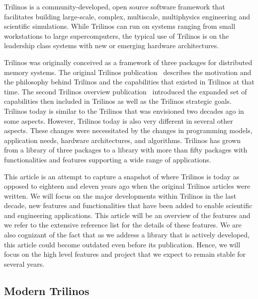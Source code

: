 


Trilinos is a community-developed, open source software framework that facilitates building large-scale, complex, multiscale, multiphysics engineering and scientific simulations. While Trilinos can run on systems ranging from small workstations to large supercomputers, the typical use of Trilinos is on the leadership class systems with new or emerging hardware architectures.

Trilinos was originally conceived as a framework of three packages for distributed memory systems. The original Trilinos publication~\cite{Heroux2005a} describes the motivation and the philosophy behind Trilinos and the capabilities that existed in Trilinos at that time. The second Trilinos overview publication~\cite{Heroux2012} introduced the expanded set of capabilities then included in Trilinos as well as the Trilinos strategic goals. Trilinos today is similar to the Trilinos that was envisioned two decades ago in some aspects. However, Trilinos today is also very different in several other aspects. These changes were necessitated by the changes in programming models, application needs, hardware architectures, and algorithms. Trilinos has grown from a library of three packages to a library with more than fifty packages with functionalities and features supporting a wide range of applications.

This article is an attempt to capture a snapshot of where Trilinos is today as opposed to eighteen and eleven years ago when the original Trilinos articles were written. We will focus on the major developments within Trilinos in the last decade, new features and functionalities that have been added to enable scientific and engineering applications. This article will be an overview of the features and we refer to the extensive reference list for the details of these features. We are also cognizant of the fact that as we address a library that is actively developed, this article could become outdated even before its publication. Hence, we will focus on the high level features and project that we expect to remain stable for several years.



\subsection{Modern Trilinos}


